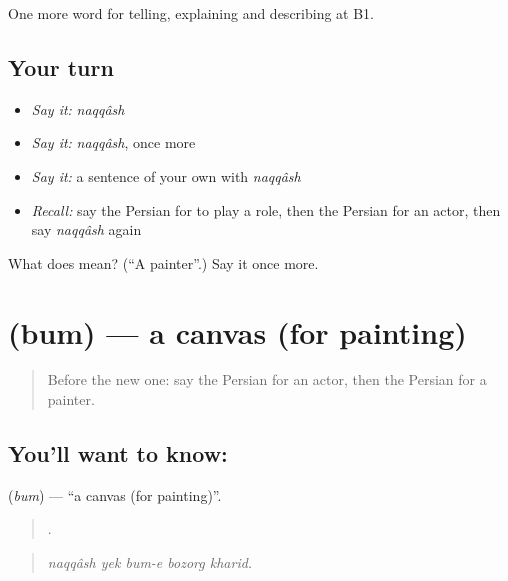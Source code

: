 \begin{grammarlens}[title={What you've built}]
One more word for telling, explaining and describing at B1.
\end{grammarlens}

\subsection*{Your turn}
\begin{itemize}
\raggedright
  \item \emph{Say it:} \emph{naqqâsh}
  \item \emph{Say it:} \emph{naqqâsh}, once more
  \item \emph{Say it:} a sentence of your own with \emph{naqqâsh}
  \item \emph{Recall:} say the Persian for to play a role, then the Persian for an actor, then say \emph{naqqâsh} again
\end{itemize}

\begin{tcolorbox}[breakable,colback=teal!4,colframe=teal!35!black,title={Before you move on}]
What does  mean? (\textquotedblleft{}A painter\textquotedblright{}.) Say it once more.
\end{tcolorbox}
\section[\texorpdfstring{\fa{بوم} (bum)}{بوم (bum)}]{ (bum) — a canvas (for painting)}

\label{lesson:FA-C525-bum}



\begin{quote}
Before the new one: say the Persian for an actor, then the Persian for a painter.
\end{quote}

\subsection*{You'll want to know: }
\textbf{} (\emph{bum}) — \textquotedblleft{}a canvas (for painting)\textquotedblright{}.

\begin{quote}
    .
\end{quote}

\begin{quote}
\emph{naqqâsh yek bum-e bozorg kharid.}
\end{quote}

